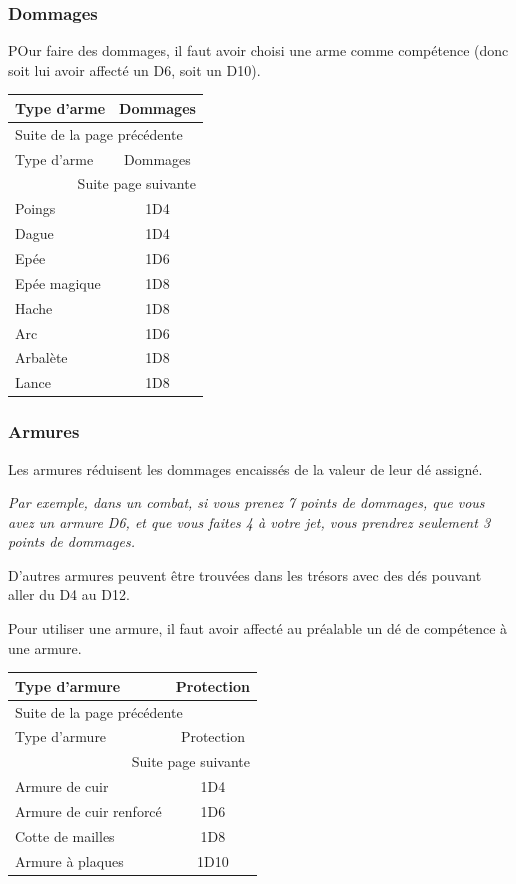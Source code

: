 \documentclass[a4paper, 11pt, twoside]{article}
\begin{document}
\newpage

\subsubsection{Dommages}
\label{sec:org4c52d2a}

POur faire des dommages, il faut avoir choisi une arme comme compétence (donc soit lui avoir affecté un D6, soit un D10).

\begin{longtable}{l|c}
Type d'arme & Dommages\\
\hline
\endfirsthead
\multicolumn{2}{l}{Suite de la page précédente} \\
\hline

Type d'arme & Dommages \\

\hline
\endhead
\hline\multicolumn{2}{r}{Suite page suivante} \\
\endfoot
\endlastfoot
\hline
Poings & 1D4\\
Dague & 1D4\\
Epée & 1D6\\
Epée magique & 1D8\\
Hache & 1D8\\
Arc & 1D6\\
Arbalète & 1D8\\
Lance & 1D8\\
\end{longtable}

\subsubsection{Armures}
\label{sec:org6a45d6f}

Les armures réduisent les dommages encaissés de la valeur de leur dé assigné.

\emph{Par exemple, dans un combat, si vous prenez 7 points de dommages, que vous avez un armure D6, et que vous faites 4 à votre jet, vous prendrez seulement 3 points de dommages.}

D'autres armures peuvent être trouvées dans les trésors avec des dés pouvant aller du D4 au D12.

Pour utiliser une armure, il faut avoir affecté au préalable un dé de compétence à une armure.

\begin{longtable}{l|c}
Type d'armure & Protection\\
\hline
\endfirsthead
\multicolumn{2}{l}{Suite de la page précédente} \\
\hline

Type d'armure & Protection \\

\hline
\endhead
\hline\multicolumn{2}{r}{Suite page suivante} \\
\endfoot
\endlastfoot
\hline
Armure de cuir & 1D4\\
Armure de cuir renforcé & 1D6\\
Cotte de mailles & 1D8\\
Armure à plaques & 1D10\\
\end{longtable}
\end{document}
